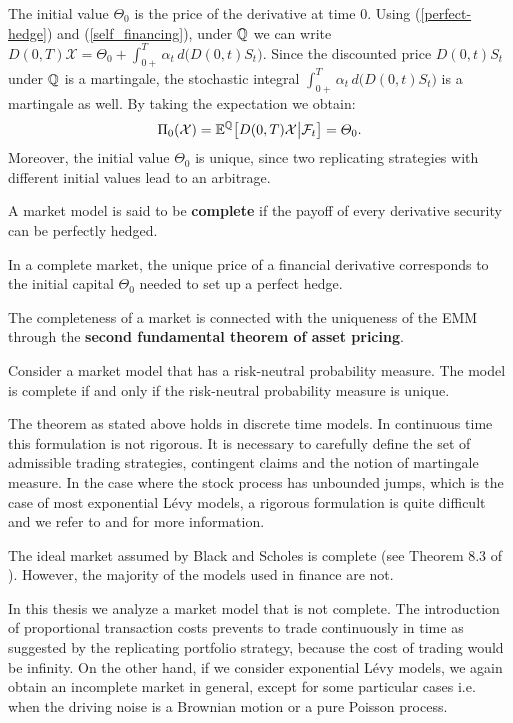 The initial value $\varTheta_0$ is the price of the derivative at time $0$.
Using (\ref{perfect-hedge}) and (\ref{self_financing}), under $\mathbb{Q}$ we can write  
$D(0,T) \mathcal{X} = \varTheta_0 + \int_{0+}^T \alpha_t \, d\bigr( D(0,t)S_t \bigr)$. Since the discounted price $D(0,t)S_t$ under $\mathbb{Q}$ is a martingale, the stochastic integral  
$\int_{0+}^T \alpha_t \, d\bigr( D(0,t)S_t \bigr)$ is a martingale as well. By taking the expectation we obtain:
\begin{equation}
   \Pi_0(\mathcal{X}) = \mathbb{E}^{\mathbb{Q}} \bigl[ D(0,T) \mathcal{X} \big| \mathcal{F}_t \bigr] = \varTheta_0.
\end{equation}
Moreover, the initial value $\varTheta_0$ is unique, since two replicating strategies with different initial values lead to an arbitrage.
\begin{Definition}
 A market model is said to be \textbf{complete} if the payoff of every derivative security can be perfectly hedged. 
\end{Definition}
In a complete market, the unique price of a financial derivative corresponds to the initial capital $\varTheta_0$ needed to set up a perfect hedge.

The completeness of a market is connected with the uniqueness of the EMM through the
\textbf{second fundamental theorem of asset pricing}.
\begin{Theorem}
 Consider a market model that has a risk-neutral probability measure. The model is complete if and only if the risk-neutral probability measure is unique.
\end{Theorem}
The theorem as stated above holds in discrete time models. In continuous time this formulation is not rigorous. 
It is necessary to carefully define the set of admissible trading strategies, contingent claims and the
notion of martingale measure. 
In the case where the stock process has unbounded jumps, which is the case of most exponential Lévy models, a rigorous formulation is quite difficult
and we refer to \cite{ChSh02} and \cite{Kabanov01} for more information.

The ideal market assumed by Black and Scholes is complete (see Theorem 8.3 of \cite{Bjork}). 
However, the majority of the models used in finance are not.

In this thesis we analyze a market model that is not complete. The introduction of proportional transaction costs prevents to trade continuously in time  
as suggested by the replicating portfolio strategy, because the cost of trading would be infinity.
On the other hand, if we consider exponential Lévy models, we again obtain an incomplete market in general,
except for some particular cases i.e. when the driving noise is a Brownian motion or a pure Poisson process.

